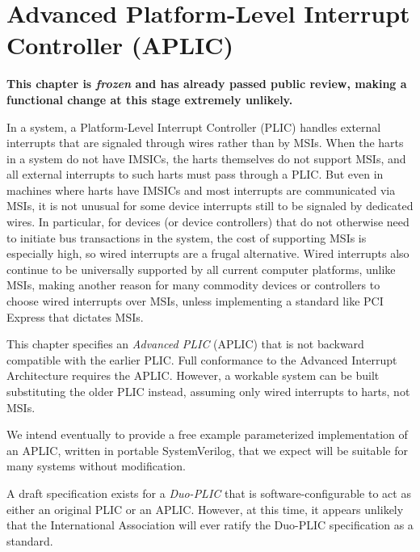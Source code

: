 
\chapter{Advanced Platform-Level Interrupt Controller (APLIC)}
\label{ch:AdvPLIC}

\textbf{%
This chapter is \emph{frozen} and has already passed public review,
making a functional change at this stage extremely unlikely.%
}
\bigskip

In a {\RISCV} system, a Platform-Level Interrupt Controller (PLIC)
handles external interrupts that are signaled through wires rather than
by MSIs.
When the {\RISCV} harts in a system do not have IMSICs, the harts
themselves do not support MSIs, and all external interrupts to such
harts must pass through a PLIC.
But even in machines where harts have IMSICs and most interrupts are
communicated via MSIs, it is not unusual for some device interrupts
still to be signaled by dedicated wires.
In particular, for devices (or device controllers) that do not
otherwise need to initiate bus transactions
in the system, the cost of supporting
MSIs is especially high, so wired interrupts are a frugal alternative.
Wired interrupts also continue to be universally supported by all
current computer platforms, unlike MSIs, making another reason for many
commodity devices or controllers to choose wired interrupts over MSIs,
unless implementing a standard like PCI Express that dictates MSIs.

This chapter specifies an \emph{Advanced PLIC} (APLIC) that is not backward
compatible with the earlier {\RISCV} PLIC.
Full conformance to the Advanced Interrupt Architecture requires the
APLIC.
However, a workable system can be built substituting the older PLIC
instead, assuming only wired interrupts to harts, not MSIs.

\begin{commentary}
We intend eventually to provide a free example parameterized
implementation of an APLIC, written in portable SystemVerilog,
that we expect will be suitable for many {\RISCV} systems without
modification.
\end{commentary}

\begin{commentary}
A draft specification exists for a\/ \emph{\mbox{Duo-PLIC}}
that is software-configurable to act as either
an original {\RISCV} PLIC or an APLIC\@.
However, at this time, it appears unlikely that
the {\RISCV} International Association will ever
ratify the Duo-PLIC specification as a standard.
\end{commentary}

